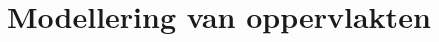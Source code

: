 \documentclass[notities.tex]{subfiles}
\begin{document}
\chapter{Modellering van oppervlakten}

\end{document}
